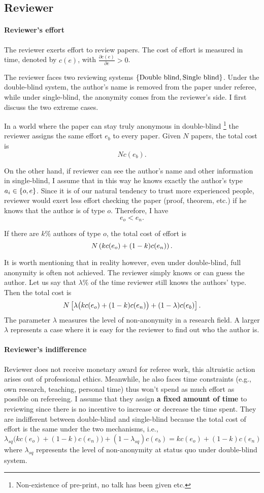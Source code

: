 \documentclass[12pt]{article}
\begin{document}
\subsection{Reviewer}
\paragraph{Reviewer's effort} The reviewer exerts effort to review papers. The cost of effort is measured in
time, denoted by $c(e)$, with $\frac{\partial c(e)}{\partial e} > 0$.

The reviewer faces two reviewing systems $\left\{\text{Double blind},\text{Single
            blind}\right\}$. Under the double-blind system, the author's name is removed from the
paper under referee, while under single-blind, the anonymity comes from the
reviewer's side. I first discuss the two extreme cases.

In a world where the paper can stay truly anonymous in double-blind
\footnote{Non-existence of pre-print, no talk has been given etc.} the reviewer
assigns the same effort $e_b$ to every paper. Given $N$ papers, the total cost
is \[ Nc(e_b).\]

On the other hand, if reviewer can see the author's name and other information
in single-blind, I assume that in this way he knows exactly the author's type
$a_i\in \left\{o,e\right\}$. Since it is of our natural tendency to trust more
experienced people, reviewer would exert less effort checking the paper (proof,
theorem, etc.) if he knows that the author is of type $o$. Therefore, I have
\[
    e_o < e_n .
\]

If there are $k\%$ authors of type $o$, the total cost of effort is
\[
    N \left(k c(e_o) + (1-k) c(e_n)\right).
\]

It is worth mentioning that in reality however, even under double-blind, full
anonymity is often not achieved. The reviewer simply knows or can guess the
author. Let us say that $\lambda\%$ of the time reviewer still knows the
authors' type. Then the total cost is
\[
    N\left[\lambda \big(k c(e_o) + (1-k) c(e_n)\big) + (1-\lambda) c(e_b)\right].
\]
The parameter $\lambda$ measures the level of non-anonymity in a research
field. A larger $\lambda$ represents a case where it is easy for the reviewer
to find out who the author is.

\paragraph{Reviewer's indifference} Reviewer does not receive monetary award for referee work, this altruistic
action arises out of professional ethics. Meanwhile, he also faces time
constraints (e.g., own research, teaching, personal time) thus won't spend as
much effort as possible on refereeing. I assume that they assign \textbf{a
    fixed amount of time} to reviewing since there is no incentive to increase or
decrease the time spent. They are indifferent between double-blind and
single-blind because the total cost of effort is the same under the two
mechanisms, i.e.,
\[
    \lambda_{sq} \big(k c(e_o) + (1-k) c(e_n)\big) + (1-\lambda_{sq}) c(e_b) = {k c(e_o) + (1-k) c(e_n)}
\] where $\lambda_{sq}$ represents the level of non-anonymity at status quo under
double-blind system.
\end{document}
